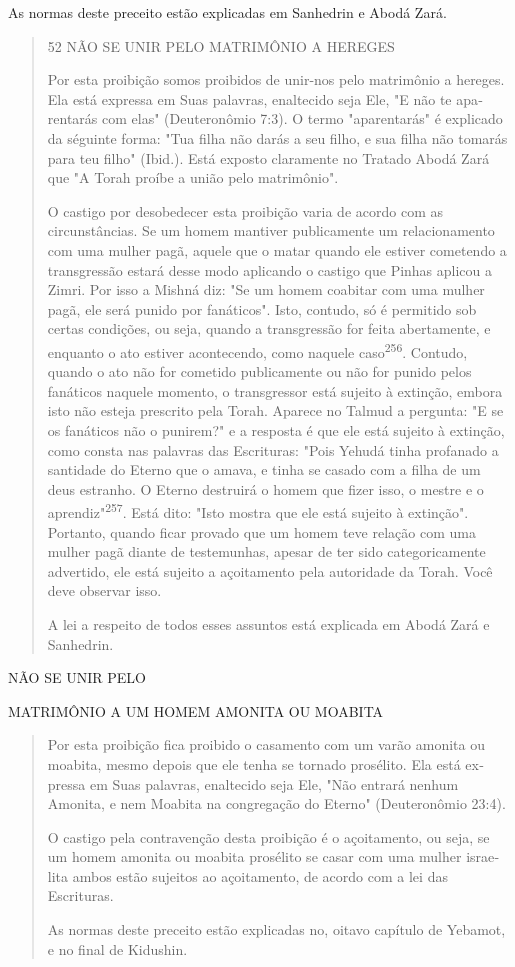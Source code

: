 As normas deste preceito estão explicadas em Sanhedrin e Abodá Zará.

\begin{quote}
52 NÃO SE UNIR PELO MATRIMÔNIO A HEREGES

Por esta proibição somos proibidos de unir-nos pelo matrimônio a
hereges. Ela está expressa em Suas palavras, enaltecido seja Ele, "E não
te apa­rentarás com elas" (Deuteronômio 7:3). O termo "aparentarás" é
explicado da séguinte forma: "Tua filha não darás a seu filho, e sua
filha não tomarás para teu filho" (Ibid.). Está exposto claramente no
Tratado Abodá Zará que "A To­rah proíbe a união pelo matrimônio".

O castigo por desobedecer esta proibição varia de acordo com as
circunstâncias. Se um homem mantiver publicamente um relacionamento com
uma mulher pagã, aquele que o matar quando ele estiver cometendo a
trans­gressão estará desse modo aplicando o castigo que Pinhas aplicou a
Zimri. Por isso a Mishná diz: "Se um homem coabitar com uma mulher pagã,
ele será pu­nido por fanáticos". Isto, contudo, só é permitido sob
certas condições, ou se­ja, quando a transgressão for feita abertamente,
e enquanto o ato estiver acon­tecendo, como naquele
caso\textsuperscript{256}. Contudo, quando o ato não for cometido
pu­blicamente ou não for punido pelos fanáticos naquele momento, o
transgres­sor está sujeito à extinção, embora isto não esteja prescrito
pela Torah. Apare­ce no Talmud a pergunta: "E se os fanáticos não o
punirem?" e a resposta é que ele está sujeito à extinção, como consta
nas palavras das Escrituras: "Pois Yehudá tinha profanado a santidade do
Eterno que o amava, e tinha se casado com a filha de um deus estranho. O
Eterno destruirá o homem que fizer isso, o mestre e o
aprendiz"\textsuperscript{257}. Está dito: "Isto mostra que ele está
sujeito à extin­ção". Portanto, quando ficar provado que um homem teve
relação com uma mulher pagã diante de testemunhas, apesar de ter sido
categoricamente adver­tido, ele está sujeito a açoitamento pela
autoridade da Torah. Você deve obser­var isso.

A lei a respeito de todos esses assuntos está explicada em Abodá Za­rá e
Sanhedrin.
\end{quote}

NÃO SE UNIR PELO

MATRIMÔNIO A UM HOMEM AMONITA OU MOABITA

\begin{quote}
Por esta proibição fica proibido o casamento com um varão amoni­ta ou
moabita, mesmo depois que ele tenha se tornado prosélito. Ela está
ex­pressa em Suas palavras, enaltecido seja Ele, "Não entrará nenhum
Amonita, e nem Moabita na congregação do Eterno" (Deuteronômio 23:4).

O castigo pela contravenção desta proibição é o açoitamento, ou se­ja,
se um homem amonita ou moabita prosélito se casar com uma mulher
israe­lita ambos estão sujeitos ao açoitamento, de acordo com a lei das
Escrituras.

As normas deste preceito estão explicadas no, oitavo capítulo de
Ye­bamot, e no final de Kidushin.
\end{quote}

